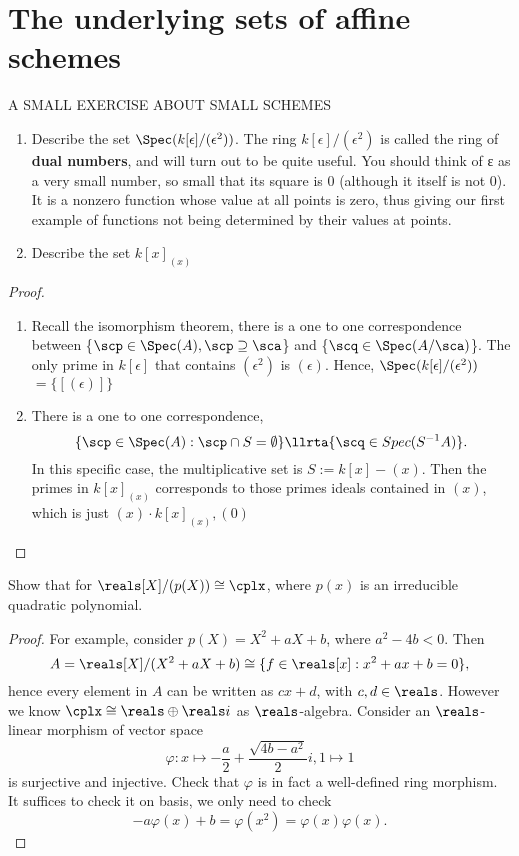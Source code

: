 \section{The underlying sets of affine schemes}
\begin{exr}
A SMALL EXERCISE ABOUT SMALL SCHEMES
\begin{enumerate}[label=(\alph*)]
\item Describe the set $\Spec(k[\epsilon]/(\epsilon^2)) $. The ring $k[\epsilon]/(\epsilon^2)$ is called the ring of \textbf{dual numbers}, and will turn out to be quite useful. You should think of ε as a very small number, so small that its square is $0$ (although it itself is not $0$). It is a nonzero function whose value at all points is zero, thus giving our first example of functions not being determined by their values at points.
\item Describe the set $k[x]_{(x)}$
\end{enumerate}
\end{exr}
\begin{proof}\ 
\begin{enumerate}[label=(\alph*)]
\item Recall the isomorphism theorem, there is a one to one correspondence between \{$\scp\in \Spec(A),\scp\supseteq \sca$\} and \{$\scq\in \Spec(A/\sca)$\}. The only prime in $k[\epsilon]$ that contains $(\epsilon^2)$ is $(\epsilon)$. Hence, $\Spec(k[\epsilon]/(\epsilon^2))$ $=\{[(\epsilon)]\}$
\item  There is a one to one correspondence,
$$
\{\scp\in \Spec(A):\scp\cap S=\emptyset \}\llrta\{\scq\in Spec(S^{-1}A)\}.
$$
In this specific case, the multiplicative set is $S:=k[x]-(x)$. Then the primes in $k[x]_{(x)}$ corresponds to those primes ideals contained in $(x)$, which is just $(x)\cdot k[x]_{(x)},(0)$  

\end{enumerate}
\end{proof}

\begin{exr}
Show that for $\reals[X]/(p(X))\cong\cplx$, where $p(x)$ is an irreducible quadratic polynomial.
\end{exr}
\begin{proof}
For example, consider $p(X)=X^2+aX+b$, where $a^2-4b<0$. Then 
$$
A=\reals[X]/(X^2+aX+b)\cong \{f\in\reals[x]: x^2+ax+b=0\},
$$
hence every element in $A$ can be written as  $cx+d$, with $c,d\in\reals$. However we know $\cplx\cong\reals\oplus\reals i$ as $\reals$-algebra. Consider an $\reals$-linear morphism of vector space 
$$
\varphi:x\longmapsto -\frac{a}{2}+\frac{\sqrt{4b-a^2}}{2} i, 1\longmapsto 1
$$ 
is surjective and injective. Check that $\varphi$ is in fact a well-defined ring morphism. It suffices to check it on basis, we only need to check 
$$
-a\varphi(x)+b=\varphi(x^2)=\varphi(x)\varphi(x).
$$
\end{proof}

